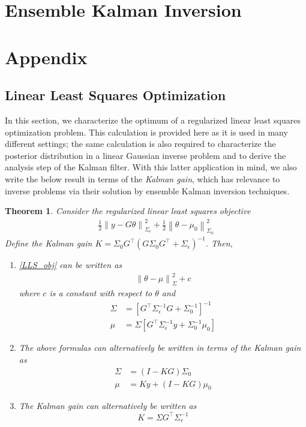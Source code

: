 \documentclass[12pt]{article}
\newcommand*{\norm}[1]{\left\lVert#1\right\rVert}
\newtheorem{thm}{Theorem}
\begin{document}
\section{Ensemble Kalman Inversion}

\section{Appendix}

\subsection{Linear Least Squares Optimization}
In this section, we characterize the optimum of a regularized linear least squares optimization problem. This calculation is provided here as it is used in many different settings; the same calculation is also required to characterize 
the posterior distribution in a linear Gaussian inverse problem and to derive the analysis step of the Kalman filter. With this latter application in mind, we also write the below result in terms of the \textit{Kalman gain}, which has 
relevance to inverse problems via their solution by ensemble Kalman inversion techniques. 

\begin{thm}
Consider the regularized linear least squares objective 
\begin{align}
\frac{1}{2} \norm{y - G\theta}^2_{\Sigma_\epsilon} + \frac{1}{2} \norm{\theta - \mu_0}^2_{\Sigma_0} \label{LLS_obj}
\end{align}
Define the Kalman gain $K = \Sigma_0 G^\top (G \Sigma_0 G^\top + \Sigma_{\epsilon})^{-1}$. Then, 
\begin{enumerate}
\item \ref{LLS_obj} can be written as 
\begin{align}
\norm{\theta - \mu}^2_\Sigma + c \label{LLN_post}
\end{align}
where $c$ is a constant with respect to $\theta$ and 
\begin{align*}
\Sigma &= \left[G^\top \Sigma^{-1}_{\epsilon} G + \Sigma^{-1}_0\right]^{-1} \\
\mu &= \Sigma \left[G^\top \Sigma^{-1}_{\epsilon}y + \Sigma_0^{-1} \mu_0  \right]
\end{align*}

\item The above formulas can alternatively be written in terms of the Kalman gain as 
\begin{align*}
\Sigma &=  (I - KG)\Sigma_0 \\
\mu &= Ky + (I - KG) \mu_0
\end{align*}

\item The Kalman gain can alternatively be written as 
\[K = \Sigma G^\top \Sigma_{\epsilon}^{-1} \]
\end{enumerate}
\end{thm}
\end{document}
